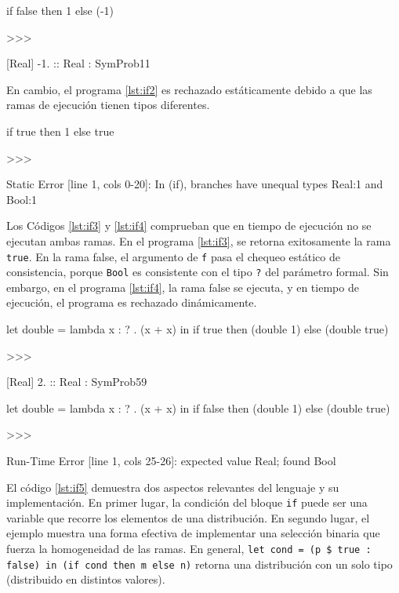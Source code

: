 \begin{gplcblock}[caption={Condicional},label={lst:if1}]
if false then 1 else (-1)

>>>

{
	 [Real] -1. :: Real : SymProb11 
}  
\end{gplcblock}

En cambio, el programa \ref{lst:if2} es rechazado
estáticamente debido a que las ramas de
ejecución tienen tipos diferentes.


\begin{gplcblock}[caption={Condicional fallido},label={lst:if2}]
if true then 1 else true

>>>

Static Error [line 1, cols 0-20]: In (if), branches have unequal types {Real:1} and {Bool:1}
\end{gplcblock}


Los Códigos \ref{lst:if3} y \ref{lst:if4} comprueban que en
tiempo de ejecución no se ejecutan ambas ramas.
En el programa \ref{lst:if3}, se retorna exitosamente la
rama \lstinline|true|. En la rama false, el argumento de \lstinline|f|
pasa el chequeo estático de consistencia, porque
\lstinline|Bool| es consistente con el tipo \lstinline|?| del parámetro
formal. Sin embargo, en el programa \ref{lst:if4}, la rama
false se ejecuta, y en tiempo de ejecución, el
programa es rechazado dinámicamente.

\begin{gplcblock}[caption={Evaluación de rama sin error},label={lst:if3}]
let double = lambda x : ? . (x + x) in
if true then (double 1) else (double true) 

>>>

{
	 [Real] 2. :: Real : SymProb59 
}  
\end{gplcblock}


\begin{gplcblock}[caption={Evaluación de rama con error},label={lst:if4}]
let double = lambda x : ? . (x + x) in
if false then (double 1) else (double true)

>>>

Run-Time Error [line 1, cols 25-26]: expected value Real; found Bool
\end{gplcblock}

El código \ref{lst:if5} demuestra dos aspectos relevantes del lenguaje y
su implementación. En primer lugar, la condición del bloque
\lstinline|if| puede ser una variable que recorre los elementos de una
distribución. En segundo lugar, el ejemplo muestra una forma efectiva
de implementar una selección binaria que fuerza la homogeneidad de las
ramas. En general,
\lstinline|let cond = (p $ true : false) in (if cond then m else n)| retorna una distribución con un solo tipo (distribuido en distintos valores).


